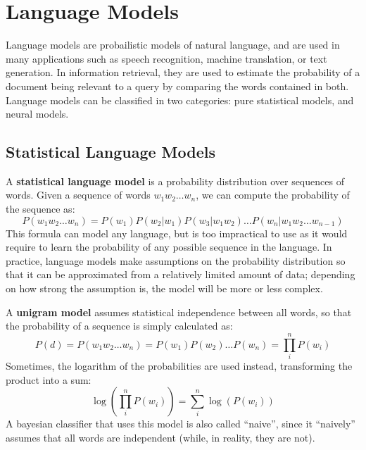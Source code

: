 \chapter{Language Models}

Language models are probailistic models of natural language, and are used in many applications such as speech recognition, machine translation, or text generation. In information retrieval, they are used to estimate the probability of a document being relevant to a query by comparing the words contained in both. Language models can be classified in two categories: pure statistical models, and neural models.

\section{Statistical Language Models}
A \textbf{statistical language model} is a probability distribution over sequences of words. Given a sequence of words $w_1 w_2 \dots w_n$, we can compute the probability of the sequence as:
\begin{equation*}
    P(w_1 w_2 \dots w_n) = P(w_1) P(w_2 | w_1) P(w_3 | w_1 w_2) \dots P(w_n | w_1 w_2 \dots w_{n-1})
\end{equation*}
This formula can model any language, but is too impractical to use as it would require to learn the probability of any possible sequence in the language. In practice, language models make assumptions on the probability distribution so that it can be approximated from a relatively limited amount of data; depending on how strong the assumption is, the model will be more or less complex.

A \textbf{unigram model} assumes statistical independence between all words, so that the probability of a sequence is simply calculated as:
\begin{equation*}
    P(d) = P(w_1 w_2 \dots w_n) = P(w_1) P(w_2) \dots P(w_n) = \prod_i^n P(w_i)
\end{equation*}
Sometimes, the logarithm of the probabilities are used instead, transforming the product into a sum:
\begin{equation*}
    \log(\prod_i^n P(w_i)) = \sum_i^n \log(P(w_i))
\end{equation*}
A bayesian classifier that uses this model is also called ``naive'', since it ``naively'' assumes that all words are independent (while, in reality, they are not).


